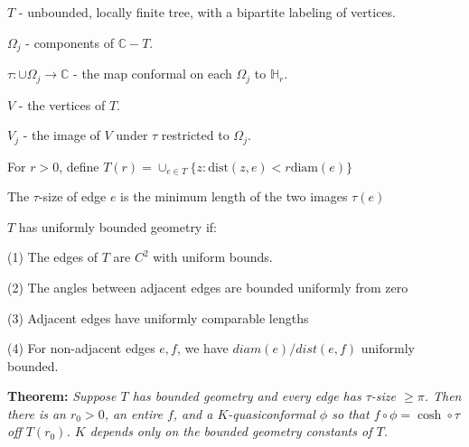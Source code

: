 \documentclass{beamer}
\begin{document}
\begin{frame}

{\tiny $T$ - unbounded, locally finite tree, with a bipartite labeling of vertices.

$\Omega_j$ - components of $\mathbb{C}-T$.

$\tau: \cup \Omega_j \rightarrow \mathbb{C}$ - the map conformal on each $\Omega_j$ to $\mathbb{H}_r$.

$V$ - the vertices of $T$. 

$V_j$ - the image of $V$ under $\tau$ restricted to $\Omega_j$.

For $r > 0$, define $T(r) = \cup_{e\in T} \{z : \textrm{dist}(z,e) < r\textrm{diam}(e) \}$

The $\tau$-size of edge $e$ is the minimum length of the two images $\tau(e)$

\vspace{2.5mm}

$T$ has uniformly bounded geometry if: 

\hspace{5mm} (1) The edges of $T$ are $C^2$ with uniform bounds. 

\hspace{5mm} (2) The angles between adjacent edges are bounded uniformly from zero

\hspace{5mm} (3) Adjacent edges have uniformly comparable lengths

\hspace{5mm} (4) For non-adjacent edges $e, f$, we have $diam(e)/dist(e,f)$ uniformly bounded. 

 }
\vspace{5mm}
{\bf Theorem:} {\it  Suppose $T$ has bounded geometry and every edge has $\tau$-size $\geq \pi$.  Then there is an $r_0 > 0$, an entire $f$, and a $K$-quasiconformal $\phi$ so that $f \circ \phi = \cosh \circ \tau$ off $T(r_0)$. $K$ depends only on the bounded geometry constants of $T$. }  

\end{frame}
\end{document}
